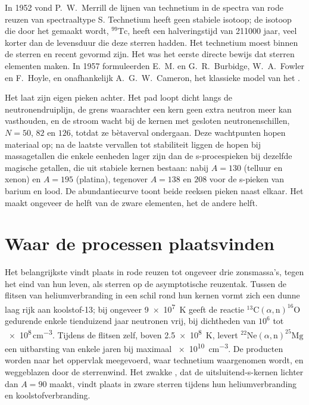 \begin{history}
In 1952 vond P.~W.~Merrill de lijnen van technetium in de spectra van
rode reuzen van spectraaltype S. Technetium heeft geen stabiele isotoop; de
isotoop die door het  gemaakt wordt, $^{99}\mathrm{Tc}$, heeft een
halveringstijd van \num{211000} jaar, veel korter dan de levensduur die deze
sterren hadden. Het technetium moest binnen de sterren en recent gevormd zijn.
Het was het eerste directe bewijs dat sterren elementen maken. In
1957 formuleerden E.~M. en G.~R.~Burbidge, W.~A.~Fowler en F.~Hoyle, en
onafhankelijk A.~G.~W.~Cameron, het klassieke model van het
.
\end{history}

Het  laat zijn eigen pieken achter. Het pad loopt dicht langs de
neutronendruiplijn, de grens waarachter een kern geen extra neutron meer kan
vasthouden, en de stroom wacht bij de kernen met gesloten neutronenschillen,
$N = 50$, $82$ en $126$, totdat ze bètaverval ondergaan. Deze wachtpunten
hopen materiaal op; na de laatste vervallen tot stabiliteit liggen de hopen
bij massagetallen die enkele eenheden lager zijn dan de s-procespieken bij
dezelfde magische getallen, die uit stabiele kernen bestaan: nabij $A = 130$
(telluur en xenon) en $A = 195$ (platina), tegenover $A = 138$ en $208$ voor de
s-pieken van barium en lood. De abundantiecurve toont beide reeksen pieken
naast elkaar. Het  maakt ongeveer de helft van de zware elementen, het
 de andere helft.

\section{Waar de processen plaatsvinden}\label{sec:b3:origin-of-elements:sites}

Het belangrijkste  vindt plaats in rode reuzen tot ongeveer drie zonsmassa's,
tegen het eind van hun leven, als sterren op de asymptotische reuzentak. Tussen de flitsen
van heliumverbranding in een schil rond hun kernen vormt zich een dunne laag rijk
aan koolstof-13; bij ongeveer \qty{9e7}{K} geeft de reactie
$^{13}\mathrm{C}(\alpha,\mathrm{n})^{16}\mathrm{O}$ gedurende enkele tienduizend jaar
neutronen vrij, bij dichtheden van $10^6$ tot
\num{e8}\,\unit{cm^{-3}}. Tijdens de flitsen zelf, boven
\qty{2.5e8}{K}, levert $^{22}\mathrm{Ne}(\alpha,\mathrm{n})^{25}\mathrm{Mg}$
een uitbarsting van enkele jaren bij maximaal \qty{e10}{cm^{-3}}. De producten
worden naar het oppervlak meegevoerd, waar technetium waargenomen wordt, en
weggeblazen door de sterrenwind. Het zwakke , dat de uitsluitend-s-kernen
lichter dan $A = 90$ maakt, vindt plaats in zware sterren tijdens hun heliumverbranding
en koolstofverbranding.

